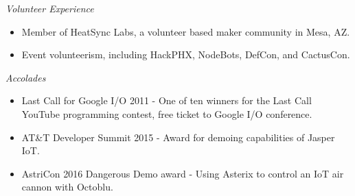 \documentclass[line,margin]{res}
\begin{document}
\begin{resume}

          \emph{Volunteer Experience}
          \begin{itemize} \itemsep -2pt %
          \item
            Member of HeatSync Labs, a volunteer based maker community in Mesa, AZ.
          \item
            Event volunteerism, including HackPHX, NodeBots, DefCon, and CactusCon.
          \end{itemize}

          \emph{Accolades}
          \begin{itemize} \itemsep -2pt
          \item
            Last Call for Google I/O 2011 - One of ten winners for the Last Call YouTube programming contest, free ticket to Google I/O conference.
          \item
            AT\&T Developer Summit 2015 - Award for demoing capabilities of Jasper IoT.
          \item
            AstriCon 2016 Dangerous Demo award - Using Asterix to control an IoT air cannon with Octoblu.
          \end{itemize}

\end{resume}
\end{document}
